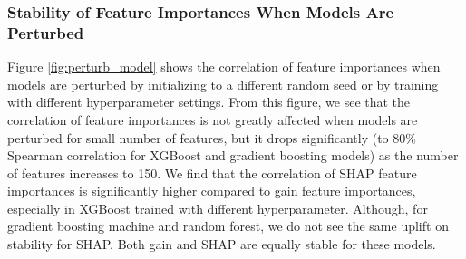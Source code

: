 


\vspace{-.3cm}
\subsubsection{Stability of Feature Importances When Models Are Perturbed}
Figure \ref{fig:perturb_model} shows the correlation of feature importances when models are perturbed by initializing to a different random seed or by training with different hyperparameter settings. From this figure, we see that the correlation of feature importances is not greatly affected when models are perturbed for small number of features, but it drops significantly (to 80\% Spearman correlation for XGBoost and gradient boosting models) as the number of features increases to 150. We find that the correlation of SHAP feature importances is significantly higher compared to gain feature importances, especially in XGBoost trained with different hyperparameter. Although, for gradient boosting machine and random forest, we do not see the same uplift on stability for SHAP. Both gain and SHAP are equally stable for these models.%

